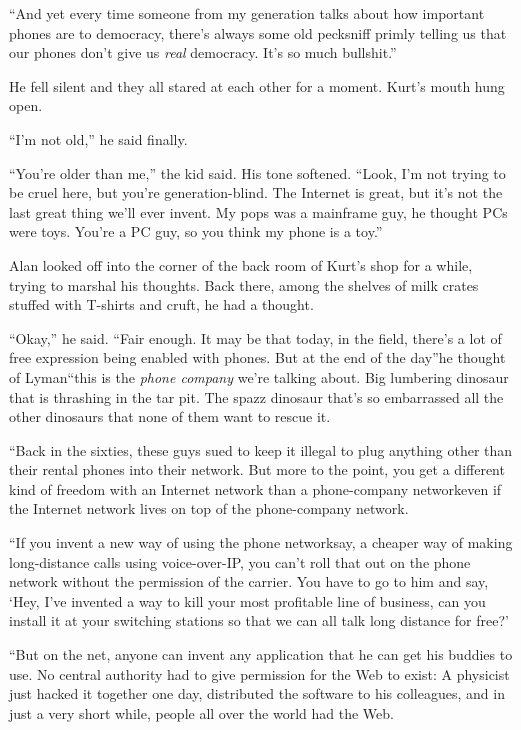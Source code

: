 ``And yet every time someone from my generation talks about how
important phones are to democracy, there's always some old pecksniff
primly telling us that our phones don't give us \textit{real}
democracy.  It's so much bullshit.''

He fell silent and they all stared at each other for a moment.  Kurt's
mouth hung open.

``I'm not old,'' he said finally.

``You're older than me,'' the kid said.  His tone softened.  ``Look,
I'm not trying to be cruel here, but you're generation-blind.  The
Internet is great, but it's not the last great thing we'll ever
invent.  My pops was a mainframe guy, he thought PCs were toys. 
You're a PC guy, so you think my phone is a toy.''

Alan looked off into the corner of the back room of Kurt's shop for a
while, trying to marshal his thoughts.  Back there, among the shelves
of milk crates stuffed with T-shirts and cruft, he had a thought.

``Okay,'' he said.  ``Fair enough.  It may be that today, in the
field, there's a lot of free expression being enabled with phones. 
But at the end of the day''\dash{}he thought of Lyman\dash{}``this is the
\textit{phone company} we're talking about.  Big lumbering dinosaur
that is thrashing in the tar pit.  The spazz dinosaur that's so
embarrassed all the other dinosaurs that none of them want to rescue
it.

``Back in the sixties, these guys sued to keep it illegal to plug
anything other than their rental phones into their network.  But more
to the point, you get a different kind of freedom with an Internet
network than a phone-company network\dash{}even if the Internet network
lives on top of the phone-company network.

``If you invent a new way of using the phone network\dash{}say, a cheaper
way of making long-distance calls using voice-over-IP, you can't roll
that out on the phone network without the permission of the carrier. 
You have to go to him and say, `Hey, I've invented a way to kill your
most profitable line of business, can you install it at your switching
stations so that we can all talk long distance for free?'

``But on the net, anyone can invent any application that he can get
his buddies to use.  No central authority had to give permission for
the Web to exist:  A physicist just hacked it together one day,
distributed the software to his colleagues, and in just a very short
while, people all over the world had the Web.


